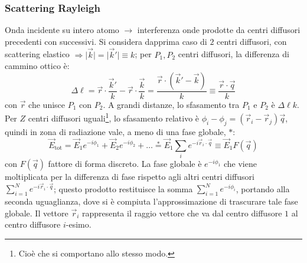 \documentclass[10pt, a4paper]{scrartcl}
\numberwithin{equation}{subsection}
\theoremstyle{style1}
\begin{document}
\subsubsection{Scattering Rayleigh}
Onda incidente su intero atomo $\to$ interferenza onde prodotte da centri diffusori precedenti con successivi. Si considera dapprima caso di $2$ centri diffusori, con scattering elastico $\Rightarrow \lvert \vec{k} \rvert = \lvert \vec{k}' \rvert \equiv k$; per $P_1,P_2$ centri diffusori, la differenza di cammino ottico \`e:
\[
\Delta \ell = \vec{r}\cdot \frac{\vec{k}'}{k} - \vec{r} \cdot \frac{\vec{k}}{k} = \frac{\vec{r}\cdot (\vec{k}' - \vec{k})}{k} \equiv \frac{\vec{r}\cdot \vec{q}}{k}
\] 
con $\vec{r}$ che unisce $P_1$ con $P_2$. A grandi distanze, lo sfasamento tra $P_1$ e $P_2$ \`e $\Delta \ell k$. Per $Z$ centri diffusori uguali\footnote{Cio\`e che si comportano allo stesso modo.}, lo sfasamento relativo \`e $\phi _i - \phi _j = (\vec{r}_i - \vec{r}_j) \vec{q} $, quindi in zona di radiazione vale, a meno di una fase globale, $*$:
\[
\vec{E}_\text{tot}= \vec{E}_1 e^{-i \phi _1} +\vec{E}_2 e^{-i\phi _2}  + \ldots \stackrel{*}{=} \vec{E}_1 \sum_{i}^{} e^{-i \vec{r}_i \cdot \vec{q}} \equiv \vec{E}_1 F(\vec{q})
\] 
con $F(\vec{q})$ fattore di forma discreto. La fase globale \`e $e^{- i \phi_1} $ che viene moltiplicata per la differenza di fase rispetto agli altri centri diffusori $\sum_{i=1}^{N} e^{-i \vec{r}_i \cdot \vec{q}} $; questo prodotto restituisce la somma $\sum_{i=1}^{N} e^{- i \phi _i} $, portando alla seconda uguaglianza, dove si \`e compiuta l'approssimazione di trascurare tale fase globale. Il vettore $\vec{r}_i$ rappresenta il raggio vettore che va dal centro diffusore $1$ al centro diffusore $i$-esimo.
\end{document}

